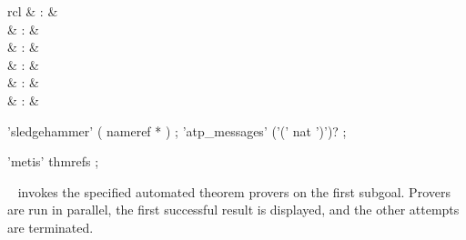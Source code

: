 \begin{isabellebody}
\begin{isamarkuptext}
  \begin{matharray}{rcl}
    \hypertarget{command.HOL.sledgehammer}{\hyperlink{command.HOL.sledgehammer}{\mbox{}}}\isa{{\isachardoublequote}\isactrlsup {\isacharasterisk}{\isachardoublequote}} & : &  \\
    \hypertarget{command.HOL.print-atps}{\hyperlink{command.HOL.print-atps}{\mbox{}}}\isa{{\isachardoublequote}\isactrlsup {\isacharasterisk}{\isachardoublequote}} & : &  \\
    \hypertarget{command.HOL.atp-info}{\hyperlink{command.HOL.atp-info}{\mbox{}}}\isa{{\isachardoublequote}\isactrlsup {\isacharasterisk}{\isachardoublequote}} & : &  \\
    \hypertarget{command.HOL.atp-kill}{\hyperlink{command.HOL.atp-kill}{\mbox{}}}\isa{{\isachardoublequote}\isactrlsup {\isacharasterisk}{\isachardoublequote}} & : &  \\
    \hypertarget{command.HOL.atp-messages}{\hyperlink{command.HOL.atp-messages}{\mbox{}}}\isa{{\isachardoublequote}\isactrlsup {\isacharasterisk}{\isachardoublequote}} & : &  \\
    \hypertarget{method.HOL.metis}{\hyperlink{method.HOL.metis}{\mbox{}}} & : &  \\
  \end{matharray}

  \begin{rail}
  'sledgehammer' ( nameref * )
  ;
  'atp\_messages' ('(' nat ')')?
  ;

  'metis' thmrefs
  ;
  \end{rail}

  \begin{description}

  \item \hyperlink{command.HOL.sledgehammer}{\mbox{}}~
  invokes the specified automated theorem provers on the first
  subgoal.  Provers are run in parallel, the first successful result
  is displayed, and the other attempts are terminated.


\end{description}
\end{isamarkuptext}
\end{isabellebody}
